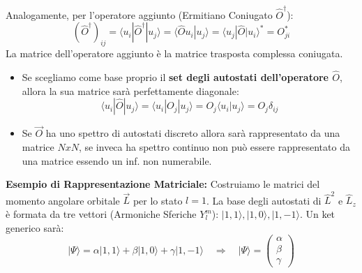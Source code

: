\documentclass[11pt, a4paper]{article}
\begin{document}
\noindent
Analogamente, per l'operatore aggiunto (Ermitiano Coniugato $\hat{O}^\dagger$): %
\begin{equation}
    (\hat{O}^\dagger)_{ij} = \langle u_i | \hat{O}^\dagger | u_j \rangle = \langle \hat{O} u_i | u_j \rangle = \langle u_j | \hat{O} | u_i \rangle^* = O_{ji}^* %
\end{equation}
La matrice dell'operatore aggiunto è la matrice trasposta complessa coniugata. %

\begin{itemize}
    \item Se scegliamo come base proprio il \textbf{set degli autostati dell'operatore $\hat{O}$}, allora la sua matrice sarà perfettamente diagonale: %
\begin{equation*}
    \langle u_i | \hat{O} | u_j \rangle = \langle u_i | O_j | u_j \rangle = O_j \langle u_i | u_j \rangle = O_j \delta_{ij} %
\end{equation*}
    \item Se $\vec{O}$ ha uno spettro di autostati discreto allora sarà rappresentato da una matrice $NxN$, se inveca ha spettro continuo non può essere rappresentato da una matrice essendo un inf. non numerabile.
\end{itemize}


\noindent
\textbf{Esempio di Rappresentazione Matriciale:} %
Costruiamo le matrici del momento angolare orbitale $\vec{L}$ per lo stato $l=1$. %
La base degli autostati di $\hat{L}^2$ e $\hat{L}_z$ è formata da tre vettori (Armoniche Sferiche $Y^m_{l}$): $|1, 1\rangle, |1, 0\rangle, |1, -1\rangle$. %
Un ket generico sarà: %
\begin{equation*}
    |\Psi\rangle = \alpha |1, 1\rangle + \beta |1, 0\rangle + \gamma |1, -1\rangle \quad \Rightarrow \quad |\Psi\rangle = \begin{pmatrix} \alpha \\ \beta \\ \gamma \end{pmatrix} %
\end{equation*}
\end{document}
